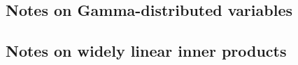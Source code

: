 \documentclass[11pt]{article}
\begin{document}
	    \subsection{Notes on Gamma-distributed variables}
	        
	    \subsection{Notes on widely linear inner products}
	        
    
    \newpage	
 	\begingroup
 		\renewcommand{\section}[2]{}%
 		
 		
 	\endgroup
\end{document}
